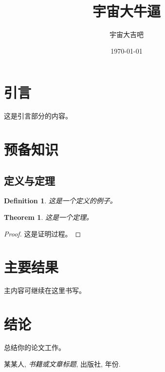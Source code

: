 \documentclass[12pt, a4paper]{article}
\title{\Huge\bfseries 宇宙大牛逼}
\author{\Large 宇宙大吉吧}
\date{\Large \today}
\newtheorem{theorem}{Theorem}[section]
\newtheorem{definition}{Definition}[section]
\begin{document}
\maketitle
\thispagestyle{empty} %
\newpage

\tableofcontents
\newpage

\section{引言}

这是引言部分的内容。

\section{预备知识}

\subsection{定义与定理}

\begin{definition}
这是一个定义的例子。
\end{definition}

\begin{theorem}
这是一个定理。
\end{theorem}

\begin{proof}
这是证明过程。
\end{proof}

\section{主要结果}

主内容可继续在这里书写。

\section{结论}

总结你的论文工作。

\newpage
\begin{thebibliography}{9}
 某某人, \emph{书籍或文章标题}, 出版社, 年份.
\end{thebibliography}
\end{document}
